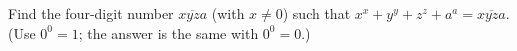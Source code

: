 Find the four-digit number $\overline{xyza}$ (with $x\ne0$) such that $x^x+y^y+z^z+a^a=\overline{xyza}$. (Use $0^0=1$; the answer is the same with $0^0=0$.)
